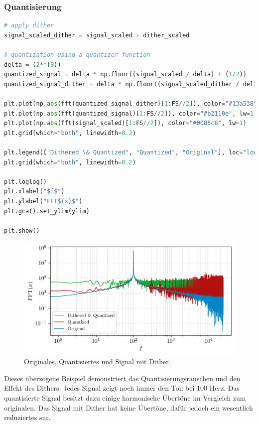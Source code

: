 \hypertarget{quantisierung}{%
\subsubsection{Quantisierung}\label{quantisierung}}

\begin{lstlisting}[language=Python]
# apply dither
signal_scaled_dither = signal_scaled - dither_scaled

# quantization using a quantizer function
delta = (2**(8))
quantized_signal = delta * np.floor((signal_scaled / delta) + (1/2))
quantized_signal_dither = delta * np.floor((signal_scaled_dither / delta) + (1/2))

plt.plot(np.abs(fft(quantized_signal_dither)[1:FS//2]), color="#13a538", lw=1)
plt.plot(np.abs(fft(quantized_signal)[1:FS//2]), color="#b2110e", lw=1)
plt.plot(np.abs(fft(signal_scaled)[1:FS//2]), color="#0085c8", lw=1)
plt.grid(which="both", linewidth=0.2)

plt.legend(["Dithered \& Quantized", "Quantized", "Original"], loc="lower left", fontsize="small")
plt.grid(which="both", linewidth=0.2)

plt.loglog()
plt.xlabel("$f$")
plt.ylabel("FFT$(x)$")
plt.gca().set_ylim(ylim)

plt.show()
\end{lstlisting}

\begin{figure}
  \centering
  \includegraphics{./img/069db9acad0a7fc28eabd04fd9e5d0eebe5249bf.png}
  \caption[Originales, Quantisiertes und Signal mit Dither]{Originales, Quantisiertes und Signal mit Dither.}
\end{figure}

Dieses überzogene Beispiel demonstriert das Quantisierungsrauschen und
den Effekt des Dithers. Jedes Signal zeigt noch immer den Ton bei
\(100\) Herz. Das quantisierte Signal besitzt dazu einige harmonische
Übertöne im Vergleich zum originalen. Das Signal mit Dither hat keine
Übertöne, dafür jedoch ein wesentlich reduziertes \gls{snr}.

